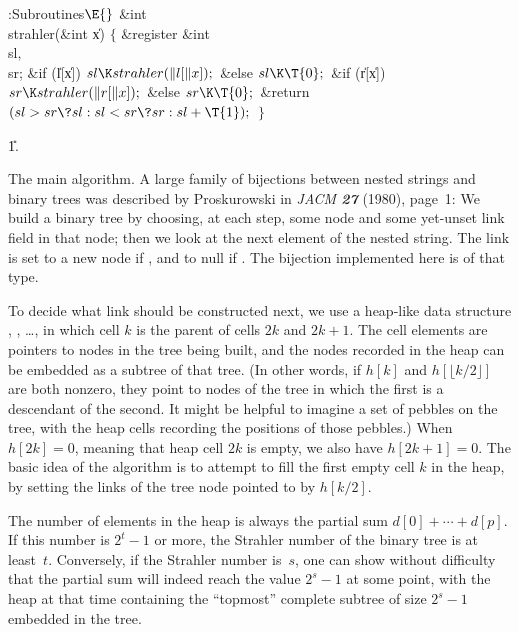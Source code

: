 \B{}:Subroutines\X${}\E{}$\6
\&{int} \\{strahler}(\&{int} \|x)\1\1\2\2\6
${}\{{}$\1\6
\&{register} \&{int} \\{sl}${},{}$ \\{sr};\7
\&{if} (\|l[\|x])\1\5
${}\\{sl}\K\\{strahler}(\|l[\|x]);{}$\2\6
\&{else}\1\5
${}\\{sl}\K\T{0};{}$\2\6
\&{if} (\|r[\|x])\1\5
${}\\{sr}\K\\{strahler}(\|r[\|x]);{}$\2\6
\&{else}\1\5
${}\\{sr}\K\T{0};{}$\2\6
\&{return} ${}(\\{sl}>\\{sr}\?\\{sl}:\\{sl}<\\{sr}\?\\{sr}:\\{sl}+\T{1});{}$\6
\4${}\}{}$\2\par
\U1.\fi

The main algorithm.
A large family of bijections between nested strings and binary
trees was described by Proskurowski in {\sl JACM\/ \bf27} (1980), page~1:
We build a binary tree by choosing, at each step, some node and some
yet-unset link field in that node; then we look at the next element
 of the nested string. The link is set to a new node if ,
and to null if . The bijection implemented here is of that
type.

To decide what link should be constructed next,
we use a heap-like data structure , ,
\dots, in which cell $k$ is the parent of cells $2k$ and $2k+1$.
The cell elements are pointers to nodes in the tree being built, and
the nodes recorded in the heap can be embedded as a subtree of that tree.
(In other words, if $h[k]$ and $h[\lfloor k/2\rfloor]$ are both
nonzero, they point to nodes of the tree in which the first is
a descendant of the second. It might be helpful to imagine a set
of pebbles on the tree, with the heap cells recording the positions
of those pebbles.)
When $h[2k]=0$, meaning that heap cell $2k$ is empty, we also have
$h[2k+1]=0$. The basic idea of the algorithm is to attempt to
fill the first empty cell $k$ in the heap, by setting the links
of the tree node pointed to by $h[k/2]$.

The number of elements in the heap is always the partial sum
$d[0]+\cdots+d[p]$. If this number is $2^t-1$ or more, the
Strahler number of the binary tree is at least~$t$. Conversely,
if the Strahler number is~$s$, one can show without difficulty
that the partial sum will indeed reach the value $2^s-1$ at some point,
with the heap at that time containing the ``topmost'' complete subtree
of size $2^s-1$ embedded in the tree.

